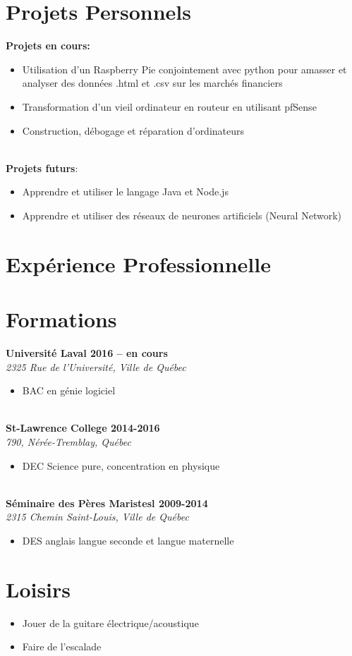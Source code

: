 \documentclass[11pt,a4paper,roman]{moderncv}        %
\begin{document}
\section {Projets Personnels}
{\bfseries Projets en cours:}
\begin{itemize}
\item Utilisation d’un Raspberry Pie conjointement avec python pour amasser et analyser des données .html et .csv sur les marchés financiers
\item Transformation d’un vieil ordinateur en routeur en utilisant pfSense
\item Construction, débogage et réparation d’ordinateurs
\end{itemize}
\hfill\\
{\bfseries Projets futurs}:
\begin{itemize}
\item Apprendre et utiliser le langage Java et Node.js
\item Apprendre et utiliser des réseaux de neurones artificiels (Neural Network)
\end{itemize}

\section{Expérience Professionnelle}

\section {Formations}
{\bfseries Université Laval \hfill 2016 – en cours}\\
\textit {2325 Rue de l'Université, Ville de Québec}
\begin{itemize} \item BAC en génie logiciel \end{itemize}
\hfill\\
{\bfseries St-Lawrence College \hfill 2014-2016}\\
\textit {790, Nérée-Tremblay, Québec}
\begin{itemize} \item DEC Science pure, concentration en physique \end{itemize}
\hfill\\
{\bfseries Séminaire des Pères Maristesl \hfill 2009-2014}\\
\textit {2315 Chemin Saint-Louis, Ville de Québec}
\begin{itemize} \item DES anglais langue seconde et langue maternelle \end{itemize}

\section{Loisirs}
\begin{itemize} 
\item Jouer de la guitare électrique/acoustique
\item Faire de l’escalade
\end{itemize}
\end{document}
